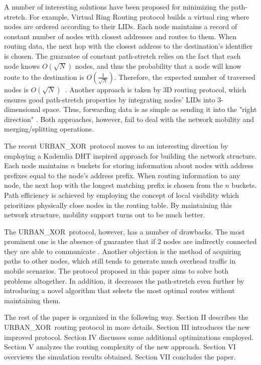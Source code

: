 \documentclass[14pt]{extarticle}
\theoremstyle{definition}
\newcommand{\urbanxor}{URBAN\_XOR}
\begin{document}
A number of interesting solutions have been proposed for minimizing the path-stretch. For example, Virtual Ring Routing protocol builds a virtual ring where nodes are ordered according to their LIDs. Each node maintains a record of constant number of nodes with closest addresses and routes to them. When routing data, the next hop with the closest address to the destination's identifier is chosen. The guarantee of constant path-stretch relies on the fact that each node knows $O(\sqrt{N})$ nodes, and thus the probability that a node will know route to the destination is $O(\frac{1}{\sqrt{N}})$. Therefore, the expected number of traversed nodes is $O(\sqrt{N})$~\cite{VRR}. Another approach is taken by 3D routing protocol, which ensures good path-stretch properties by integrating nodes' LIDs into 3-dimensional space. Thus, forwarding data is as simple as sending it into the "right direction" \cite{3drp}. Both approaches, however, fail to deal with the network mobility and merging/splitting operations. 

The recent \urbanxor\ protocol moves to an interesting direction by employing a Kademlia DHT inspired approach for building the network structure. Each node maintains $n$ buckets for storing information about nodes with address prefixes equal to the node's address prefix. When routing information to any node, the next hop with the longest matching prefix is chosen from the $n$ buckets. Path efficiency is achieved by employing the concept of local visibility which prioritizes physically close nodes in the routing table. By maintaining this network structure, mobility support turns out to be much better.

The \urbanxor\ protocol, however, has a number of drawbacks. The most prominent one is the absence of guarantee that if 2 nodes are indirectly connected they are able to communicate \cite{Pasquini}. Another objection is the method of acquiring paths to other nodes, which still tends to generate much overhead traffic in mobile scenarios. The protocol proposed in this paper aims to solve both problems altogether. In addition, it decreases the path-stretch even further by introducing a novel algorithm that selects the most optimal routes without maintaining them.

The rest of the paper is organized in the following way. Section II describes the \urbanxor\ routing protocol in more details. Section III introduces the new improved protocol. Section IV discusses some additional optimizations employed. Section V analyzes the routing complexity of the new approach. Section VI overviews the simulation results obtained. Section VII concludes the paper.
\end{document}

